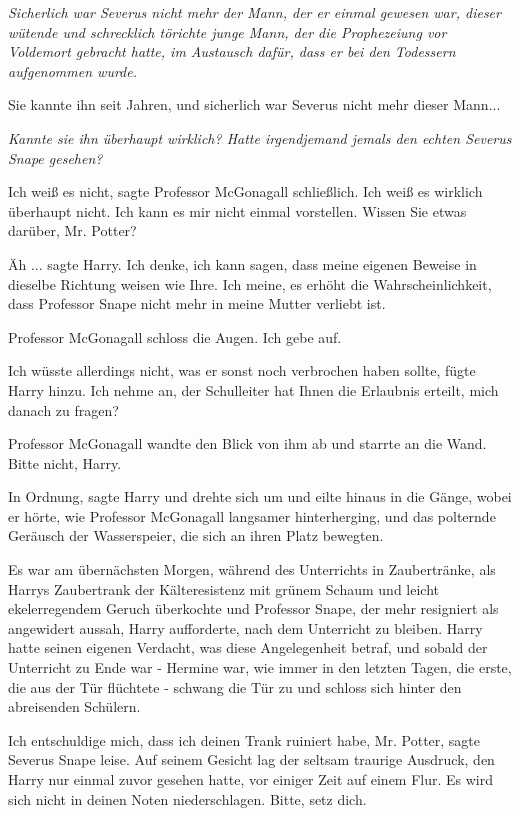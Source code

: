 \emph{Sicherlich war Severus nicht mehr der Mann, der er einmal gewesen war, dieser wütende und schrecklich törichte junge Mann, der die Prophezeiung vor Voldemort gebracht hatte, im Austausch dafür, dass er bei den Todessern aufgenommen wurde.}

Sie kannte ihn seit Jahren, und sicherlich war Severus nicht mehr dieser Mann...

\emph{Kannte sie ihn überhaupt wirklich? Hatte irgendjemand jemals den echten Severus Snape gesehen?}

\glqq Ich weiß es nicht\grqq{}, sagte Professor McGonagall schließlich. \glqq
Ich weiß es wirklich überhaupt nicht. Ich kann es mir nicht einmal vorstellen.
Wissen Sie etwas darüber, Mr. Potter?\grqq{}

\glqq Äh ...\grqq{} sagte Harry. \glqq Ich denke, ich kann sagen, dass meine
eigenen Beweise in dieselbe Richtung weisen wie Ihre. Ich meine, es erhöht die
Wahrscheinlichkeit, dass Professor Snape nicht mehr in meine Mutter verliebt
ist.\grqq{}

Professor McGonagall schloss die Augen. \glqq Ich gebe auf.\grqq{}

\glqq Ich wüsste allerdings nicht, was er sonst noch verbrochen haben
sollte\grqq{}, fügte Harry hinzu. \glqq Ich nehme an, der Schulleiter hat Ihnen
die Erlaubnis erteilt, mich danach zu fragen?\grqq{}

Professor McGonagall wandte den Blick von ihm ab und starrte an die Wand. \glqq
Bitte nicht, Harry.\grqq{}

\glqq In Ordnung\grqq{}, sagte Harry und drehte sich um und eilte hinaus in die
Gänge, wobei er hörte, wie Professor McGonagall langsamer hinterherging, und das
polternde Geräusch der Wasserspeier, die sich an ihren Platz bewegten.

Es war am übernächsten Morgen, während des Unterrichts in Zaubertränke, als
Harrys Zaubertrank der Kälteresistenz mit grünem Schaum und leicht
ekelerregendem Geruch überkochte und Professor Snape, der mehr resigniert als
angewidert aussah, Harry aufforderte, nach dem Unterricht zu bleiben. Harry
hatte seinen eigenen Verdacht, was diese Angelegenheit betraf, und sobald der
Unterricht zu Ende war - Hermine war, wie immer in den letzten Tagen, die erste,
die aus der Tür flüchtete - schwang die Tür zu und schloss sich hinter den
abreisenden Schülern.

\glqq Ich entschuldige mich, dass ich deinen Trank ruiniert habe, Mr.
Potter\grqq{}, sagte Severus Snape leise. Auf seinem Gesicht lag der seltsam
traurige Ausdruck, den Harry nur einmal zuvor gesehen hatte, vor einiger Zeit
auf einem Flur. \glqq Es wird sich nicht in deinen Noten niederschlagen. Bitte,
setz dich.\grqq{}

